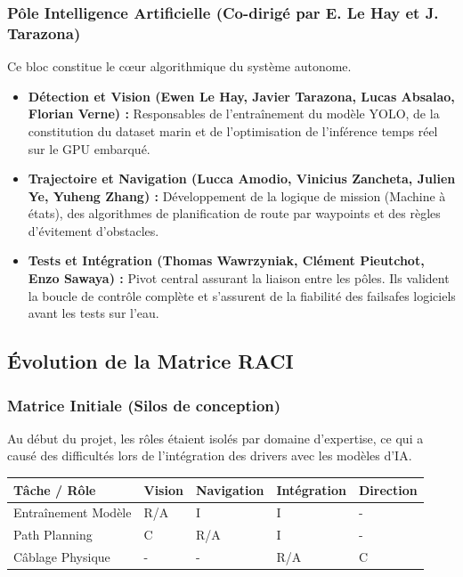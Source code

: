 \documentclass[11pt, a4paper]{article}
\begin{document}
\subsubsection{Pôle Intelligence Artificielle (Co-dirigé par E. Le Hay et J. Tarazona)}
Ce bloc constitue le cœur algorithmique du système autonome.
\begin{itemize}
    \item \textbf{Détection et Vision (Ewen Le Hay, Javier Tarazona, Lucas Absalao, Florian Verne) :} Responsables de l'entraînement du modèle YOLO, de la constitution du dataset marin et de l'optimisation de l'inférence temps réel sur le GPU embarqué.
    \item \textbf{Trajectoire et Navigation (Lucca Amodio, Vinicius Zancheta, Julien Ye, Yuheng Zhang) :} Développement de la logique de mission (Machine à états), des algorithmes de planification de route par waypoints et des règles d'évitement d'obstacles.
    \item \textbf{Tests et Intégration (Thomas Wawrzyniak, Clément Pieutchot, Enzo Sawaya) :} Pivot central assurant la liaison entre les pôles. Ils valident la boucle de contrôle complète et s'assurent de la fiabilité des failsafes logiciels avant les tests sur l'eau.
\end{itemize}

\subsection{Évolution de la Matrice RACI}

\subsubsection{Matrice Initiale (Silos de conception)}
Au début du projet, les rôles étaient isolés par domaine d'expertise, ce qui a causé des difficultés lors de l'intégration des drivers avec les modèles d'IA.
\begin{center}
\small
\begin{tabularx}{\textwidth}{lXXXX}
\toprule
\textbf{Tâche / Rôle} & Vision & Navigation & Intégration & Direction \\
\midrule
Entraînement Modèle & R/A & I & I & - \\
Path Planning & C & R/A & I & - \\
Câblage Physique & - & - & R/A & C \\
\bottomrule
\end{tabularx}
\end{center}
\end{document}
